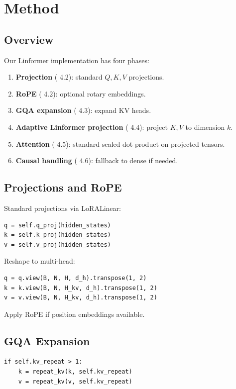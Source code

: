 \section{Method}

\subsection{Overview}

Our Linformer implementation has four phases:

\begin{enumerate}
\item \textbf{Projection} ( 4.2): standard $Q, K, V$ projections.
\item \textbf{RoPE} ( 4.2): optional rotary embeddings.
\item \textbf{GQA expansion} ( 4.3): expand KV heads.
\item \textbf{Adaptive Linformer projection} ( 4.4): project $K, V$ to dimension $k$.
\item \textbf{Attention} ( 4.5): standard scaled-dot-product on projected tensors.
\item \textbf{Causal handling} ( 4.6): fallback to dense if needed.

\end{enumerate}
\subsection{Projections and RoPE}

Standard projections via LoRALinear:

\begin{lstlisting}
q = self.q_proj(hidden_states)
k = self.k_proj(hidden_states)
v = self.v_proj(hidden_states)
\end{lstlisting}

Reshape to multi-head:

\begin{lstlisting}
q = q.view(B, N, H, d_h).transpose(1, 2)
k = k.view(B, N, H_kv, d_h).transpose(1, 2)
v = v.view(B, N, H_kv, d_h).transpose(1, 2)
\end{lstlisting}

Apply RoPE if position embeddings available.

\subsection{GQA Expansion}

\begin{lstlisting}
if self.kv_repeat > 1:
    k = repeat_kv(k, self.kv_repeat)
    v = repeat_kv(v, self.kv_repeat)
\end{lstlisting}

